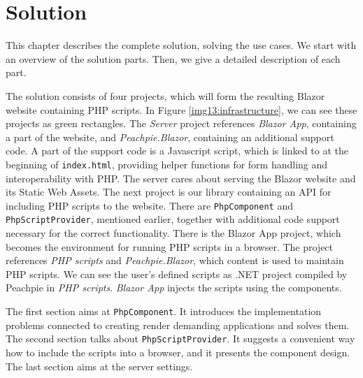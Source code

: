 \chapter{Solution}

This chapter describes the complete solution, solving the use cases.
We start with an overview of the solution parts.
Then, we give a detailed description of each part.
\par
The solution consists of four projects, which will form the resulting Blazor website containing PHP scripts.
In Figure \ref{img13:infrastructure}, we can see these projects as green rectangles.
The \textit{Server} project references \textit{Blazor App}, containing a part of the website, and \textit{Peachpie.Blazor}, containing an additional support code.
A part of the support code is a Javascript script, which is linked to at the beginning of \texttt{index.html}, providing helper functions for form handling and interoperability with PHP.  
The server cares about serving the Blazor website and its Static Web Assets.
The next project is our library containing an API for including PHP scripts to the website.
There are \texttt{PhpComponent} and \texttt{PhpScriptProvider}, mentioned earlier, together with additional code support necessary for the correct functionality.
There is the Blazor App project, which becomes the environment for running PHP scripts in a browser.
The project references \textit{PHP scripts} and \textit{Peachpie.Blazor}, which content is used to maintain PHP scripts.
We can see the user's defined scripts as .NET project compiled by Peachpie in \textit{PHP scripts}.
\textit{Blazor App} injects the scripts using the components.
\par
The first section aims at \texttt{PhpComponent}.
It introduces the implementation problems connected to creating render demanding applications and solves them.
The second section talks about \texttt{PhpScriptProvider}.
It suggests a convenient way how to include the scripts into a browser, and it presents the component design.
The last section aims at the server settings.
\par
